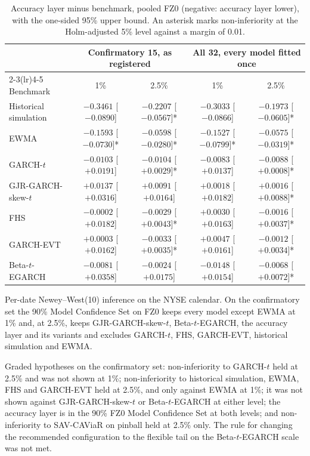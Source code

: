 \documentclass[11pt]{article}
\begin{document}
\begin{table}[htbp]\centering\begin{threeparttable}
\caption{Accuracy layer minus benchmark, pooled FZ0 (negative: accuracy layer lower), with the one-sided 95\% upper bound. An asterisk marks non-inferiority at the Holm-adjusted 5\% level against a margin of 0.01.}\label{tab:crossasset}\footnotesize\setlength{\tabcolsep}{4pt}
\begin{tabular}{lcccc}\toprule
 & \multicolumn{2}{c}{Confirmatory 15, as registered} & \multicolumn{2}{c}{All 32, every model fitted once} \\ \cmidrule(lr){2-3}\cmidrule(lr){4-5}
Benchmark & 1\% & 2.5\% & 1\% & 2.5\% \\ \midrule
Historical simulation & $-0.3461$ [$-0.0890$] & $-0.2207$ [$-0.0567$]* & $-0.3033$ [$-0.0866$] & $-0.1973$ [$-0.0605$]* \\
EWMA & $-0.1593$ [$-0.0730$]* & $-0.0598$ [$-0.0280$]* & $-0.1527$ [$-0.0799$]* & $-0.0575$ [$-0.0319$]* \\
GARCH-$t$ & $-0.0103$ [$+0.0191$] & $-0.0104$ [$+0.0029$]* & $-0.0083$ [$+0.0137$] & $-0.0088$ [$+0.0008$]* \\
GJR-GARCH-skew-$t$ & $+0.0137$ [$+0.0316$] & $+0.0091$ [$+0.0164$] & $+0.0018$ [$+0.0182$] & $+0.0016$ [$+0.0088$]* \\
FHS & $-0.0002$ [$+0.0182$] & $-0.0029$ [$+0.0043$]* & $+0.0030$ [$+0.0163$] & $-0.0016$ [$+0.0037$]* \\
GARCH-EVT & $+0.0003$ [$+0.0162$] & $-0.0033$ [$+0.0035$]* & $+0.0047$ [$+0.0161$] & $-0.0012$ [$+0.0034$]* \\
Beta-$t$-EGARCH & $-0.0081$ [$+0.0358$] & $-0.0024$ [$+0.0175$] & $-0.0148$ [$+0.0154$] & $-0.0068$ [$+0.0072$]* \\
\bottomrule\end{tabular}
\begin{tablenotes}\footnotesize\item Per-date Newey--West(10) inference on the NYSE calendar. On the confirmatory set the 90\% Model Confidence Set on FZ0 keeps every model except EWMA at 1\% and, at 2.5\%, keeps GJR-GARCH-skew-$t$, Beta-$t$-EGARCH, the accuracy layer and its variants and excludes GARCH-$t$, FHS, GARCH-EVT, historical simulation and EWMA.\end{tablenotes}
\end{threeparttable}\end{table}

Graded hypotheses on the confirmatory set: non-inferiority to GARCH-$t$ held at 2.5\% and was not shown at 1\%; non-inferiority to historical simulation, EWMA, FHS and GARCH-EVT held at 2.5\%, and only against EWMA at 1\%; it was not shown against GJR-GARCH-skew-$t$ or Beta-$t$-EGARCH at either level; the accuracy layer is in the 90\% FZ0 Model Confidence Set at both levels; and non-inferiority to SAV-CAViaR on pinball held at 2.5\% only. The rule for changing the recommended configuration to the flexible tail on the Beta-$t$-EGARCH scale was not met.
\end{document}
